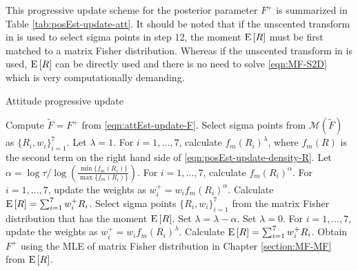 This progressive update scheme for the posterior parameter $F^+$ is summarized in Table \ref{tab:posEst-update-att}.
It should be noted that if the unscented transform in \cite{lee2018bayesian} is used to select sigma points in step 12, the moment $\mathrm{E}\left[ R \right]$ must be first matched to a matrix Fisher distribution.
Whereas if the unscented transform in \cite{gilitschenski2015unscented} is used, $\mathrm{E}\left[ R \right]$ can be directly used and there is no need to solve \eqref{eqn:MF-S2D} which is very computationally demanding.

\begin{table}
	\caption{Attitude progressive update}
	\label{tab:posEst-update-att}
	\begin{algorithmic}[1]
		\algrule[0.8pt]
		\algrule
		\State Compute $\tilde{F} = F^+$ from \eqref{eqn:attEst-update-F}.
		\State Select sigma points \cite{gilitschenski2015unscented,lee2018bayesian} from $\mathcal{M}(\tilde{F})$ as $\{R_i,w_i\}_{i=1}^7$.
		\State Let $\lambda = 1$.
		\State For $i=1,\ldots,7$, calculate $f_m(R_i)^\lambda$, where $f_m(R)$ is the second term on the right hand side of \eqref{eqn:posEst-update-density-R}.
		\State Let $\alpha = \log\tau / \log\left( \tfrac{\min\{f_m(R_i)\}}{\max\{f_m(R_i)\}} \right)$.
		\State For $i=1,\ldots,7$, calculate $f_m(R_i)^\alpha$.
		\State For $i=1,\ldots,7$, update the weights as $w_i^+ = w_i f_m(R_i)^\alpha$.
		\State Calculate $\mathrm{E}\left[ R \right] = \sum_{i=1}^7 w_i^+ R_i$.
		\State Select sigma points $\{R_i,w_i\}_{i=1}^7$ from the matrix Fisher distribution that has the moment $\mathrm{E}\left[ R \right]$.
		\State Set $\lambda = \lambda-\alpha$.
		\Else
		\State Set $\lambda = 0$.
		\EndIf
		\EndWhile
		\State For $i=1,\ldots,7$, update the weights as $w_i^+ = w_i f_m(R_i)^\lambda$.
		\State Calculate $\mathrm{E}\left[ R \right] = \sum_{i=1}^7 w_i^+ R_i$.
		\State Obtain $F^+$ using the MLE of matrix Fisher distribution in Chapter \ref{section:MF-MF} from $\mathrm{E}\left[ R \right]$.
		\EndProcedure
		\algrule[0.8pt]
	\end{algorithmic}
\end{table}

